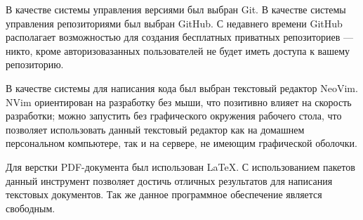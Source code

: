 В качестве системы управления версиями был выбран Git. В качестве системы 
управления репозиториями был выбран GitHub. С недавнего времени GitHub 
располагает возможностью для создания бесплатных приватных репозиториев ---
никто, кроме авторизовазанных пользователей не будет иметь доступа к вашему
репозиторию.

В качестве системы для написания кода был выбран текстовый редактор NeoVim.
NVim ориентирован на разработку без мыши, что позитивно влияет на скорость 
разработки; можно запустить без графического окружения рабочего стола, что
позволяет использовать данный текстовый редактор как на домашнем персональном
компьютере, так и на сервере, не имеющим графической оболочки.

Для верстки PDF-документа был использован \LaTeX. С использованием пакетов
данный инструмент позволяет достичь отличных результатов для написания
текстовых документов. Так же данное программное обеспечение является свободным.



\showbib


